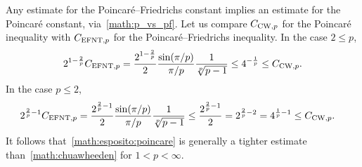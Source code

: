 \documentclass[10pt,a4paper]{article}
\begin{document}
\begin{remark}
    Any estimate for the Poincar\'e--Friedrichs constant implies an estimate for the Poincar\'e constant, via~\eqref{math:p_vs_pf}. 
    Let us compare $C_{{\rm CW},p}$ for the Poincar\'e inequality
    with $C_{{\rm EFNT},p}$ for the Poincar\'e--Friedrichs inequality. 
    In the case $2 \leq p$, 
    \begin{align*}
        2^{1-\frac 2 p}
        C_{{\rm EFNT},p}
        =
        \frac{ 2^{1-\frac 2 p} }{2}
        \frac{ \sin(\pi/p) }{ \pi/p }
        \frac{ 1 }{ \sqrt[p]{p-1} }
        \leq 
        4^{-\frac 1 p}
        \leq
        C_{{\rm CW},p} 
        .
    \end{align*}
    In the case $p \leq 2$,
    \begin{align*}
        2^{\frac 2 p - 1}
        C_{{\rm EFNT},p}
        =
        \frac{ 2^{\frac 2 p - 1} }{2}
        \frac{ \sin(\pi/p) }{ \pi/p }
        \frac{ 1 }{ \sqrt[p]{p-1} }
        \leq
        \frac{ 2^{\frac 2 p-1} }{2}
        &
        =
        2^{\frac 2 p - 2}
        =
        4^{\frac 1 p - 1}
        \leq
        C_{{\rm CW},p} 
        .
    \end{align*}
    It follows that~\eqref{math:esposito:poincare} is generally a tighter estimate than~\eqref{math:chuawheeden} for $1 < p < \infty$.
\end{remark}
\end{document}
